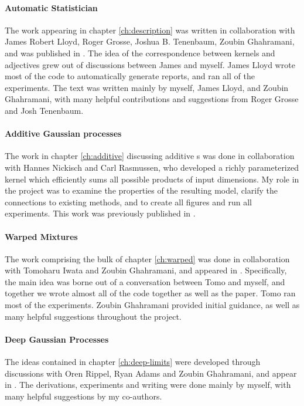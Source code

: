 \paragraph{Automatic Statistician} The work appearing in chapter \ref{ch:description} was written in collaboration with James Robert Lloyd, Roger Grosse, Joshua B. Tenenbaum, Zoubin Ghahramani, and was published in \citep{LloDuvGroetal14}.
The idea of the correspondence between kernels and adjectives grew out of discussions between James and myself.
James Lloyd wrote most of the code to automatically generate reports, and ran all of the experiments.
The text was written mainly by myself, James Lloyd, and Zoubin Ghahramani, with many helpful contributions and suggestions from Roger Grosse and Josh Tenenbaum.

\paragraph{Additive Gaussian processes}
The work in chapter \ref{ch:additive} discussing additive \gp{}s was done in collaboration with Hannes Nickisch and Carl Rasmussen, who developed a richly parameterized kernel which efficiently sums all possible products of input dimensions.
My role in the project was to examine the properties of the resulting model, clarify the connections to existing methods, and to create all figures and run all experiments.
This work was previously published in \citep{duvenaud2011additive11}.

\paragraph{Warped Mixtures}
The work comprising the bulk of chapter \ref{ch:warped} was done in collaboration with Tomoharu Iwata and Zoubin Ghahramani, and appeared in \citep{IwaDuvGha12}.
Specifically, the main idea was borne out of a conversation between Tomo and myself, and together we wrote almost all of the code together as well as the paper.
Tomo ran most of the experiments.
Zoubin Ghahramani provided initial guidance, as well as many helpful suggestions throughout the project.


\paragraph{Deep Gaussian Processes}
The ideas contained in chapter \ref{ch:deep-limits} were developed through discussions with Oren Rippel, Ryan Adams and Zoubin Ghahramani, and appear in \citep{DuvRipAdaGha14}.  The derivations, experiments and writing were done mainly by myself, with many helpful suggestions by my co-authors.

\outbpdocument{


}


